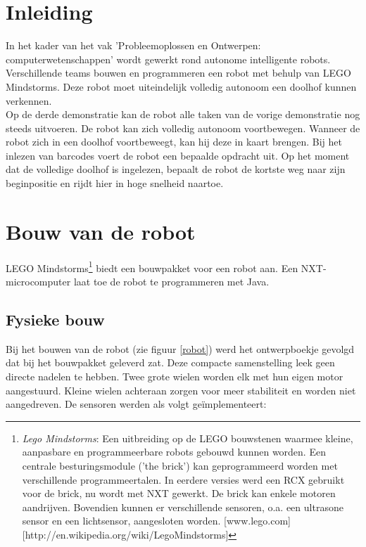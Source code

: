 \documentclass[tt3]{penoverslag}
\begin{document}
\newpage 

\section{Inleiding} %
\label{ssec:inl}
In het kader van het vak 'Probleemoplossen en Ontwerpen: computerwetenschappen' wordt gewerkt rond autonome intelligente robots. Verschillende teams bouwen en programmeren een robot met behulp van LEGO Mindstorms. Deze robot moet uiteindelijk volledig autonoom een doolhof kunnen verkennen.\\
Op de derde demonstratie kan de robot alle taken van de vorige demonstratie nog steeds uitvoeren. De robot kan zich volledig autonoom voortbewegen. Wanneer de robot zich in een doolhof voortbeweegt, kan hij deze in kaart brengen. Bij het inlezen van barcodes voert de robot een bepaalde opdracht uit. Op het moment dat de volledige doolhof is ingelezen, bepaalt de robot de kortste weg naar zijn beginpositie en rijdt hier in hoge snelheid naartoe.

\section{Bouw van de robot} %
\label{sec:bouw}
LEGO Mindstorms\footnote{\textit{Lego Mindstorms}:  Een uitbreiding op de LEGO bouwstenen waarmee kleine, aanpasbare en programmeerbare robots gebouwd kunnen worden. Een centrale besturingsmodule ('the brick') kan geprogrammeerd worden met verschillende programmeertalen. In eerdere versies werd een RCX gebruikt voor de brick, nu wordt met NXT gewerkt. De brick kan enkele motoren aandrijven. Bovendien kunnen er verschillende sensoren, o.a. een ultrasone sensor en een lichtsensor, aangesloten worden.  \mbox{[www.lego.com]} \mbox{[http://en.wikipedia.org/wiki/Lego\textendash Mindstorms]}} biedt een bouwpakket voor een robot aan. Een NXT-microcomputer laat toe de robot te programmeren met Java.

\subsection{Fysieke bouw} %
\label{ssec:fysbouw}
Bij het bouwen van de robot (zie figuur \ref{robot}) werd het ontwerpboekje gevolgd dat bij het bouwpakket geleverd zat. Deze compacte samenstelling leek geen directe nadelen te hebben. Twee grote wielen worden elk met hun eigen motor aangestuurd. Kleine wielen achteraan zorgen voor meer stabiliteit en worden niet aangedreven. De sensoren werden als volgt ge\"implementeert: 
\end{document}
